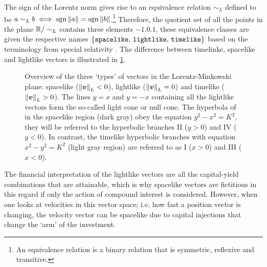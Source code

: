 The sign of the Lorentz norm gives rise to an equivalence relation \(\sim_L\) defined to be \(a \sim_L b \iff \operatorname{sgn}{\norm{a}} = \operatorname{sgn}{\norm{b}}\).\footnote{An equivalence relation is a binary relation that is symmetric, reflexive and transitive.} Therefore, the quotient set of all the points in the plane \(\mathbb{R} / \sim_L \) contains three elements \(\qty{-1, 0, 1}\), these equivalence classes are given the respective names \(\qty{\text{\texttt{spacelike}},\, \text{\texttt{lightlike}},\, \text{\texttt{timelike}}}\) based on the terminology from special relativity \cite{Landau1971}. The difference between timelinke, spacelike and lightlike vectors is illustrated in \cref{fig:lightlike_spacelike}.

\begin{figure}[ht]
    \centering
    
    \caption{Overview of the three `types' of vectors in the Lorentz-Minkowski plane: spacelike (\(\norm{\vb*{v}}_L < 0\)), lightlike (\(\norm{\vb*{v}}_L = 0\)) and timelike (\(\norm{\vb*{v}}_L > 0\)). The lines \(y = x\) and \(y = -x\) containing all the lightlike vectors form the so-called light cone or null cone. The hyperbola of in the spacelike region (dark gray) obey the equation \(y^2 - x^2 = K^2\), they will be referred to the hyperbolic branches II (\(y > 0\)) and IV (\(y < 0\)). In contrast, the timelike hyperbolic branches with equation \(x^2 - y^2 = K^2\) (light gray region) are referred to as I (\(x > 0\)) and III (\(x < 0\)).}
    \label{fig:lightlike_spacelike}
\end{figure}
The financial interpretation of the lightlike vectors are all the capital-yield combinations that are attainable, which is why spacelike vectors are fictitious in this regard if only the action of compound interest is considered. However, when one looks at velocities in this vector space; i.e. how fast a position vector is changing, the velocity vector can be spacelike due to capital injections that change the `arm' of the investment. 

